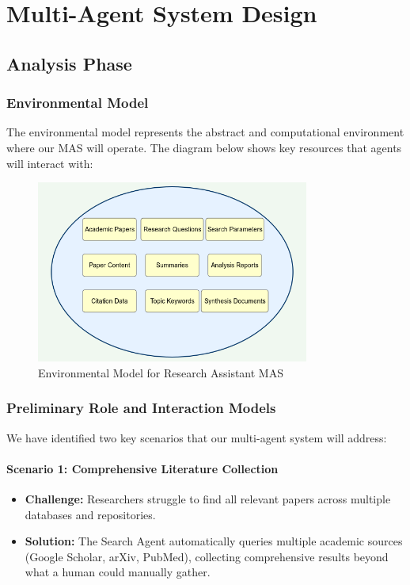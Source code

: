 \documentclass[11pt,a4paper]{article}
\begin{document}
\section{Multi-Agent System Design}

\subsection{Analysis Phase}

\subsubsection{Environmental Model}
The environmental model represents the abstract and computational environment where our MAS will operate. The diagram below shows key resources that agents will interact with:

\begin{figure}[H]
    \centering
    \includegraphics[width=0.8\textwidth]{images/environmental-model.png}
    \caption{Environmental Model for Research Assistant MAS}
    \label{fig:env-model}
\end{figure}

\subsubsection{Preliminary Role and Interaction Models}

We have identified two key scenarios that our multi-agent system will address:

\paragraph{Scenario 1: Comprehensive Literature Collection}
\begin{itemize}
    \item \textbf{Challenge:} Researchers struggle to find all relevant papers across multiple databases and repositories.
    \item \textbf{Solution:} The Search Agent automatically queries multiple academic sources (Google Scholar, arXiv, PubMed), collecting comprehensive results beyond what a human could manually gather.
\end{itemize}
\end{document}
